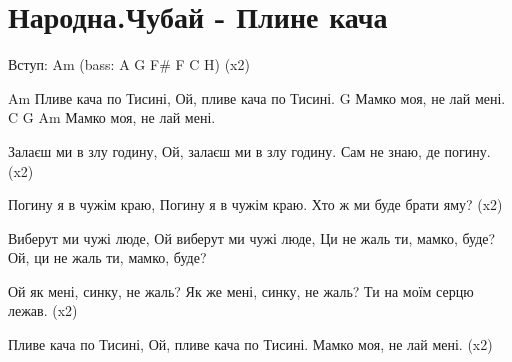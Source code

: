 ﻿\section{Народна\Т.Чубай - Плине кача}
\begin{guitar}

Вступ: Am (bass: A G F# F C H)  (x2)

Am
   Пливе кача по Тисині,
   Ой, пливе кача по Тисині.
                      G
   Мамко моя, не лай мені.
    C      G   Am
   Мамко моя, не лай мені.

Залаєш ми в злу годину,
Ой, залаєш ми в злу годину.
Сам не знаю, де погину.   (x2)

Погину я в чужім краю,
Погину я в чужім краю.
Хто ж ми буде брати яму?  (x2)

Виберут ми чужі люде,
Ой виберут ми чужі люде,
Ци не жаль ти, мамко, буде?
Ой, ци не жаль ти, мамко, буде?

Ой як мені, синку, не жаль?
Як же мені, синку, не жаль?
Ти на моїм серцю лежав.   (x2)

Пливе кача по Тисині,
Ой, пливе кача по Тисині.
Мамко моя, не лай мені.   (x2)
\end{guitar}